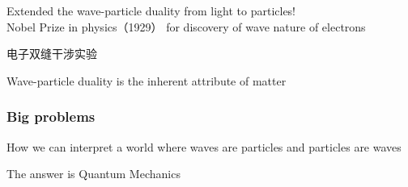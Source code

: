 \begin{frame} 
    \begin{tcolorbox}[colback=yellow!10,colframe=red!75!black,title=]
        Extended the wave-particle duality from light to particles! \\
        {\color{deepred} Nobel Prize in physics（1929）} for discovery of wave nature of electrons
    \end{tcolorbox}  
\end{frame}

\begin{frame}{电子双缝干涉实验}
    \end{frame}

\begin{frame}  
    \begin{tcolorbox}[colback=yellow!10,colframe=red!75!black,title=Conclusion]
    Wave-particle duality is the inherent attribute of matter
    \end{tcolorbox} 
\end{frame}

\begin{frame}  
    \frametitle{Big problems} 
  \begin{center}
    How we can interpret a world where waves are particles and particles are waves
  \end{center} 
\end{frame}

\begin{frame}  
  \begin{center}
    The answer is \alert{Quantum Mechanics}
  \end{center} 
\end{frame}

